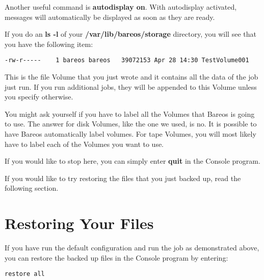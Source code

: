 Another useful command is {\bf autodisplay on}. 
With autodisplay activated, messages will automatically be displayed as soon as they are ready.

If you do an {\bf ls -l} of your {\bf /var/lib/bareos/storage} directory, you will see that you
have the following item:

\footnotesize
\begin{verbatim}
-rw-r-----    1 bareos bareos   39072153 Apr 28 14:30 TestVolume001
\end{verbatim}
\normalsize

This is the file Volume that you just wrote and it contains all the data of
the job just run. If you run additional jobs, they will be appended to this
Volume unless you specify otherwise.

You might ask yourself if you have to label all the Volumes that Bareos is
going to use. The answer for disk Volumes, like the one we used, is no. It is
possible to have Bareos automatically label volumes. For tape Volumes, you
will most likely have to label each of the Volumes you want to use.

If you would like to stop here, you can simply enter {\bf quit} in the Console
program.

% 
% 

If you would like to try restoring the files that you just backed up, read the
following section.
\label{restoring}

\section{Restoring Your Files}

If you have run the default configuration and run the job as demonstrated above, 
you can restore the backed up files in the Console
program by entering:

\footnotesize
\begin{verbatim}
restore all
\end{verbatim}
\normalsize

